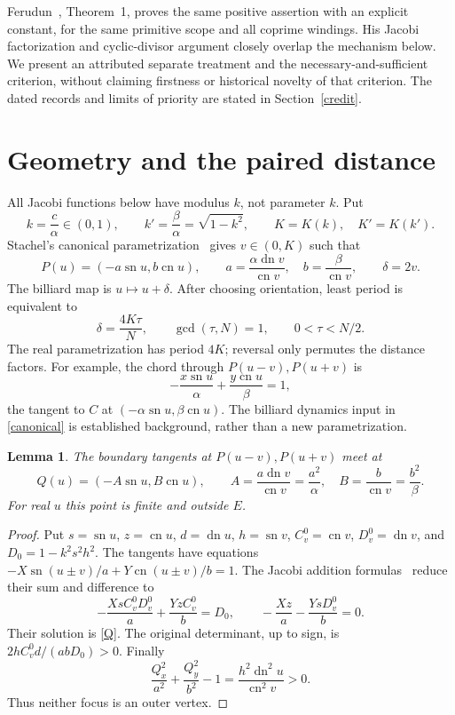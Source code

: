 \documentclass[11pt]{article}
\newcommand{\sn}{\operatorname{sn}}
\newcommand{\cn}{\operatorname{cn}}
\newcommand{\dn}{\operatorname{dn}}
\newtheorem{lemma}{Lemma}
\begin{document}
Ferudun~\cite{Ferudun}, Theorem~1, proves the same positive assertion
with an explicit constant, for the same primitive scope and all coprime
windings. His Jacobi factorization and cyclic-divisor argument closely
overlap the mechanism below. We present an attributed separate treatment
and the necessary-and-sufficient criterion, without claiming firstness or
historical novelty of that criterion. The dated records and limits of
priority are stated in Section~\ref{credit}.

\section{Geometry and the paired distance}
All Jacobi functions below have modulus $k$, not parameter $k$. Put
\[
 k=\frac c\alpha\in(0,1),\qquad k'=\frac\beta\alpha=\sqrt{1-k^2},
 \qquad K=K(k),\quad K'=K(k').
\]
Stachel's canonical parametrization~\cite[Theorem~4.3 and (4.9)]{Stachel}
gives $v\in(0,K)$ such that
\begin{equation}\label{canonical}
 P(u)=(-a\sn u,b\cn u),\qquad
 a=\frac{\alpha\dn v}{\cn v},\quad b=\frac\beta{\cn v},
 \qquad\delta=2v.
\end{equation}
The billiard map is $u\mapsto u+\delta$. After choosing orientation,
least period is equivalent to
\begin{equation}\label{closure}
 \delta=\frac{4K\tau}{N},\qquad
 \gcd(\tau,N)=1,\qquad 0<\tau<N/2.
\end{equation}
The real parametrization has period $4K$; reversal only permutes the
distance factors. For example, the chord through $P(u-v),P(u+v)$ is
\[
 -\frac{x\sn u}{\alpha}+\frac{y\cn u}{\beta}=1,
\]
the tangent to $C$ at $(-\alpha\sn u,\beta\cn u)$.
The billiard dynamics input in \eqref{canonical} is established
background, rather than a new parametrization.

\begin{lemma}\label{geometry}
The boundary tangents at $P(u-v),P(u+v)$ meet at
\begin{equation}\label{Q}
 Q(u)=(-A\sn u,B\cn u),\qquad
 A=\frac{a\dn v}{\cn v}=\frac{a^2}{\alpha},\quad
 B=\frac b{\cn v}=\frac{b^2}{\beta}.
\end{equation}
For real $u$ this point is finite and outside $E$.
\end{lemma}
\begin{proof}
Put $s=\sn u$, $z=\cn u$, $d=\dn u$, $h=\sn v$,
$C_v^0=\cn v$, $D_v^0=\dn v$, and $D_0=1-k^2s^2h^2$.
The tangents have equations
$-X\sn(u\pm v)/a+Y\cn(u\pm v)/b=1$.
The Jacobi addition formulas~\cite[Section~22.8]{DLMF} reduce their
sum and difference to
\[
 -\frac{XsC_v^0D_v^0}{a}+\frac{YzC_v^0}{b}=D_0,
 \qquad -\frac{Xz}{a}-\frac{YsD_v^0}{b}=0.
\]
Their solution is \eqref{Q}. The original determinant, up to sign, is
$2hC_v^0d/(abD_0)>0$. Finally
\[
 \frac{Q_x^2}{a^2}+\frac{Q_y^2}{b^2}-1
 =\frac{h^2\dn^2u}{\cn^2v}>0.
\]
Thus neither focus is an outer vertex.
\end{proof}
\end{document}
